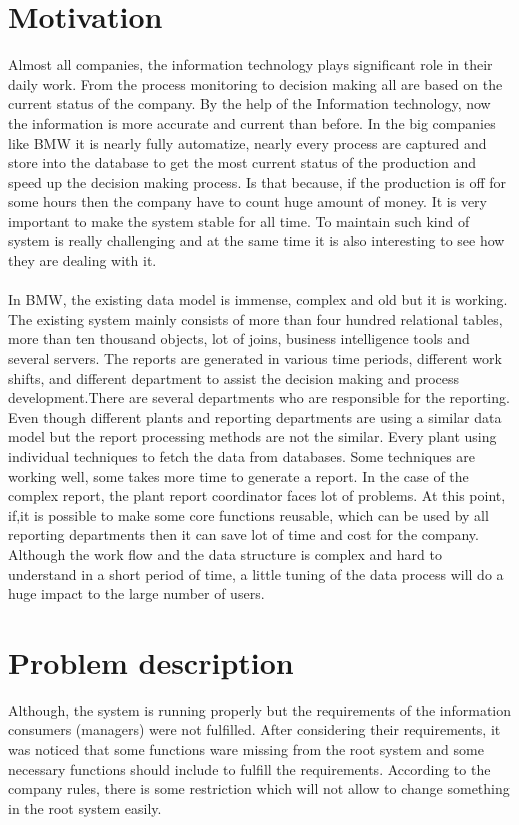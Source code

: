 \section{Motivation}
Almost all companies, the information technology plays significant role in their daily work. From the process monitoring to decision making all are based on the current status of the company. By the help of the Information technology, now the  information is more accurate and current than before. In the big companies like BMW it is nearly fully automatize, nearly every process are captured and store into the database to get the most current status of the production and speed up the decision making process. Is that because, if the production is off for some hours then the company have to count huge amount of money. It is very important to make the system stable for all time. To maintain such kind of system is really challenging and at the same time it is also interesting to see how they are dealing with it.\\\\
In BMW, the existing data model is immense, complex and old but it is working. The existing system mainly consists of more than four hundred relational tables, more than ten thousand objects, lot of joins, business intelligence tools and several servers. The reports are generated in various time periods, different work shifts, and different department to assist the decision making and process development.There are several departments who are responsible for the reporting. Even though different plants and reporting departments are using a similar data model but the report processing methods are not the similar. Every plant using individual techniques to fetch the data from databases. Some techniques are working well, some takes more time  to generate a report.  In the case of the complex report, the plant report coordinator faces lot of problems. At this point, if,it is possible to make some core functions reusable, which can be used by all reporting departments then it can save lot of time and cost for the company.\\

Although the work flow and the data structure is complex and hard to understand in a short period of time, a little tuning of the data process will do a huge impact to the large number of users.\\ 


\section{Problem description }
Although, the system is running properly but the requirements of the information consumers (managers) were not fulfilled. After considering their requirements, it was noticed that some functions ware missing from the root system and  some necessary functions should include to fulfill the requirements. According to the company rules, there is some restriction which will not allow to  change something in the root system easily. \\

